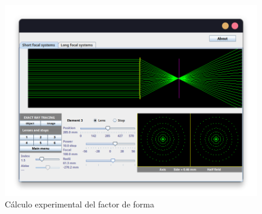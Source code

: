 \documentclass[11pt]{article}
\begin{document}
\begin{figure}[ht]
\begin{subcaptionblock}{.333\textwidth}
                \end{subcaptionblock}%
                \begin{subcaptionblock}{.333\textwidth}
                    \centering
                    \includegraphics[width=\textwidth]{fotos/parte 1/Aberraciones/Aberración Esférica/abbEsf61.png}
                    \caption{$q=0.77$}
                \end{subcaptionblock}    
                \caption{Cálculo experimental del factor de forma}
            \end{figure}
\end{document}
